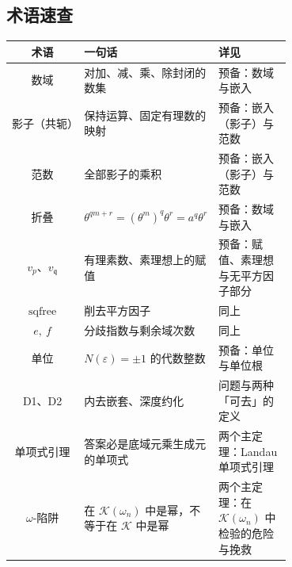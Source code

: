 \documentclass[UTF8,a4paper,11pt]{ctexart}
\begin{document}
\subsection{术语速查}
\begin{center}
\begin{tabular}{c|>{\raggedright\arraybackslash}p{0.44\linewidth}|>{\raggedright\arraybackslash}p{0.26\linewidth}}
\toprule
术语 & 一句话 & 详见 \\
\midrule
数域 & 对加、减、乘、除封闭的数集 & 预备：数域与嵌入 \\
影子（共轭） & 保持运算、固定有理数的映射 & 预备：嵌入（影子）与范数 \\
范数 & 全部影子的乘积 & 预备：嵌入（影子）与范数 \\
折叠 & $\theta^{qm+r}=(\theta^m)^q\theta^r=a^q\theta^r$ & 预备：数域与嵌入 \\
$v_p$、$v_{\mathfrak{q}}$ & 有理素数、素理想上的赋值 & 预备：赋值、素理想与无平方因子部分 \\
$\operatorname{sqfree}$ & 削去平方因子 & 同上 \\
$e,\ f$ & 分歧指数与剩余域次数 & 同上 \\
单位 & $N(\varepsilon)=\pm1$ 的代数整数 & 预备：单位与单位根 \\
D1、D2 & 内去嵌套、深度约化 & 问题与两种「可去」的定义 \\
单项式引理 & 答案必是底域元乘生成元的单项式 & 两个主定理：Landau 单项式引理 \\
$\omega$-陷阱 & 在 $\mathscr{K}(\omega_n)$ 中是幂，不等于在 $\mathscr{K}$ 中是幂 & 两个主定理：在 $\mathscr{K}(\omega_n)$ 中检验的危险与挽救 \\
\bottomrule
\end{tabular}
\end{center}
\end{document}
